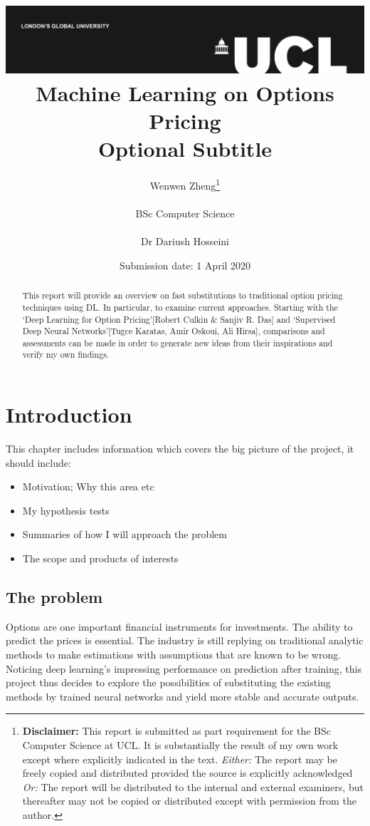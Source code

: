 \documentclass{report}
\title{{\vspace{-14em} \includegraphics[scale=0.4]{ucl_logo.png}}\\
{{\Huge Machine Learning on Options Pricing}}\\
{\large Optional Subtitle}\\
}
\date{Submission date: 1 April 2020}
\author{Wenwen Zheng\thanks{
{\bf Disclaimer:}
This report is submitted as part requirement for the BSc Computer Science at UCL. It is
substantially the result of my own work except where explicitly indicated in the text.
\emph{Either:} The report may be freely copied and distributed provided the source is explicitly acknowledged
\newline  
\emph{Or:}\newline
The report will be distributed to the internal and external examiners, but thereafter may not be copied or distributed except with permission from the author.}
\\ \\
BSc Computer Science\\ \\
Dr Dariush Hosseini }
\begin{document}
 
\onehalfspacing
\maketitle
\begin{abstract}
This report will provide an overview on fast substitutions to traditional option pricing techniques using DL. In particular, to examine current approaches. Starting with the ‘Deep Learning for Option Pricing’[Robert Culkin & Sanjiv R. Das] and ‘Supervised Deep Neural Networks’[Tugce Karatas, Amir Oskoui, Ali Hirsa], comparisons and assessments can be made in order to generate new ideas from their inspirations and verify my own findings. 

\end{abstract}
\tableofcontents
\setcounter{page}{1}


\chapter{Introduction}
This chapter includes information which covers the big picture of the project, it should include:
\begin{itemize}
\item Motivation; Why this area etc
\item My hypothesis tests
\item Summaries of how I will approach the problem
\item The scope and products of interests
\end{itemize}

\section{The problem}
Options are one important financial instruments for investments. The ability to predict the prices is essential. The industry is still replying on traditional analytic methods to make estimations with assumptions that are known to be wrong. Noticing deep learning's impressing performance on prediction after training, this project thus decides to explore the possibilities of substituting the existing methods by trained neural networks and yield more stable and accurate outputs.
\end{document}
